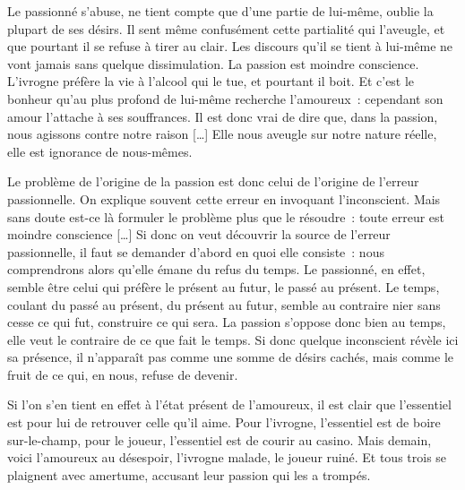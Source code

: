 {Le passionné s'abuse, ne tient compte que d'une partie de lui-même,
oublie la plupart de ses désirs. Il sent même confusément cette
partialité qui l'aveugle, et que pourtant il se refuse à tirer au
clair. Les discours qu'il se tient à lui-même ne vont jamais sans
quelque dissimulation. La passion est moindre conscience. L'ivrogne
préfère la vie à l'alcool qui le tue, et pourtant il boit. Et c'est
le bonheur qu'au plus profond de lui-même recherche l'amoureux~:
cependant son amour l'attache à ses souffrances. Il est donc vrai de
dire que, dans la passion, nous agissons contre notre raison […] Elle
nous aveugle sur notre nature réelle, elle est ignorance de
nous-mêmes.

Le problème de l'origine de la passion est donc celui de l'origine de
l'erreur passionnelle. On explique souvent cette erreur en invoquant
l'inconscient. Mais sans doute est-ce là formuler le problème plus
que le résoudre~: toute erreur est moindre conscience […] Si donc on
veut découvrir la source de l'erreur passionnelle, il faut se
demander d'abord en quoi elle consiste~: nous comprendrons alors
qu'elle émane du refus du temps. Le passionné, en effet, semble être
celui qui préfère le présent au futur, le passé au présent. Le temps,
coulant du passé au présent, du présent au futur, semble au contraire
nier sans cesse ce qui fut, construire ce qui sera. La passion
s'oppose donc bien au temps, elle veut le contraire de ce que fait le
temps. Si donc quelque inconscient révèle ici sa présence, il
n'apparaît pas comme une somme de désirs cachés, mais comme le fruit
de ce qui, en nous, refuse de devenir.

Si l'on s'en tient en effet à l'état présent de l'amoureux, il est
clair que l'essentiel est pour lui de retrouver celle qu'il aime.
Pour l'ivrogne, l'essentiel est de boire sur-le-champ, pour le
joueur, l'essentiel est de courir au casino. Mais demain, voici
l'amoureux au désespoir, l'ivrogne malade, le joueur ruiné. Et tous
trois se plaignent avec amertume, accusant leur passion qui les a
trompés.
}

